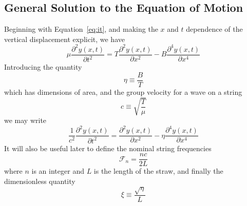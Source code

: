 \documentclass[twoside]{article}
\begin{document}
\begin{multicols}{2}
\subsection{General Solution to the Equation of Motion}
Beginning with Equation~\ref{eq:it}, and making the $x$ and $t$ dependence of the vertical displacement explicit, we have 
\begin{equation}
\mu \frac{\partial^2y(x,t)}{\partial t^2} = T \frac{\partial^2y(x,t)}{\partial x^2} - B \frac{\partial^4y(x,t)}{\partial x^4}
\end{equation}
Introducing the quantity
\begin{equation}
\eta  \equiv \frac{B}{T}
\end{equation}
which has dimensions of area, and the group velocity for a wave on a string
\begin{equation}
c  \equiv \sqrt{\frac{T}{\mu}}
\end{equation}
we may write
\begin{equation}
\frac{1}{c^2} \frac{\partial^2y(x,t)}{\partial t^2} = \frac{\partial^2y(x,t)}{\partial x^2} - \eta \frac{\partial^4y(x,t)}{\partial x^4}
\label{eq:mot}
\end{equation}
It will also be useful later to define the nominal string frequencies
\begin{equation}
	\mathcal{F}_n = \frac{nc}{2L}
\end{equation}
where $n$ is an integer and $L$ is the length of the straw, and finally the dimensionless quantity
\begin{equation}
\xi  \equiv \frac{\sqrt{\eta}}{L}
\label{eq:xi}
\end{equation}


\end{multicols}
\end{document}
